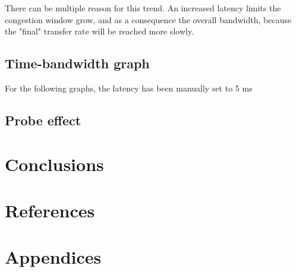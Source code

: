 \documentclass[a4paper,10pt]{article}
\begin{document}
There can be multiple reason for this trend. An increased latency limits the congestion window grow, and as a consequence the overall bandwidth, because the "final" transfer rate will be reached more slowly.

\subsection{Time-bandwidth graph}

For the following graphs, the latency has been manually set to 5 ms

\subsection{Probe effect}

\section{Conclusions}

\newpage

\section{References}

\printbibliography

\section{Appendices}
\end{document}
